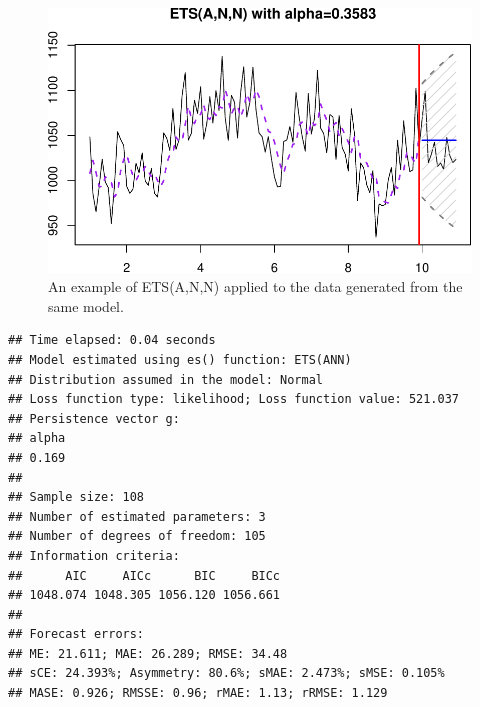 \documentclass[]{book}
\newenvironment{Shaded}{\begin{snugshade}}{\end{snugshade}}
\newcommand{\CommentTok}[1]{\textcolor[rgb]{0.56,0.35,0.01}{\textit{#1}}}
\newcommand{\DataTypeTok}[1]{\textcolor[rgb]{0.13,0.29,0.53}{#1}}
\newcommand{\DecValTok}[1]{\textcolor[rgb]{0.00,0.00,0.81}{#1}}
\newcommand{\FloatTok}[1]{\textcolor[rgb]{0.00,0.00,0.81}{#1}}
\newcommand{\KeywordTok}[1]{\textcolor[rgb]{0.13,0.29,0.53}{\textbf{#1}}}
\newcommand{\NormalTok}[1]{#1}
\newcommand{\OperatorTok}[1]{\textcolor[rgb]{0.81,0.36,0.00}{\textbf{#1}}}
\newcommand{\OtherTok}[1]{\textcolor[rgb]{0.56,0.35,0.01}{#1}}
\newcommand{\StringTok}[1]{\textcolor[rgb]{0.31,0.60,0.02}{#1}}
\theoremstyle{definition}
\theoremstyle{definition}
\theoremstyle{definition}
\theoremstyle{definition}
\theoremstyle{remark}
\begin{document}
\begin{Shaded}
\end{Shaded}

\begin{figure}
\centering
\includegraphics{Svetunkov--2022----ADAM_files/figure-latex/ETSANNExample-1.pdf}
\caption{\label{fig:ETSANNExample}An example of ETS(A,N,N) applied to the data generated from the same model.}
\end{figure}

\begin{verbatim}
## Time elapsed: 0.04 seconds
## Model estimated using es() function: ETS(ANN)
## Distribution assumed in the model: Normal
## Loss function type: likelihood; Loss function value: 521.037
## Persistence vector g:
## alpha 
## 0.169 
## 
## Sample size: 108
## Number of estimated parameters: 3
## Number of degrees of freedom: 105
## Information criteria:
##      AIC     AICc      BIC     BICc 
## 1048.074 1048.305 1056.120 1056.661 
## 
## Forecast errors:
## ME: 21.611; MAE: 26.289; RMSE: 34.48
## sCE: 24.393%; Asymmetry: 80.6%; sMAE: 2.473%; sMSE: 0.105%
## MASE: 0.926; RMSSE: 0.96; rMAE: 1.13; rRMSE: 1.129
\end{verbatim}
\end{document}

